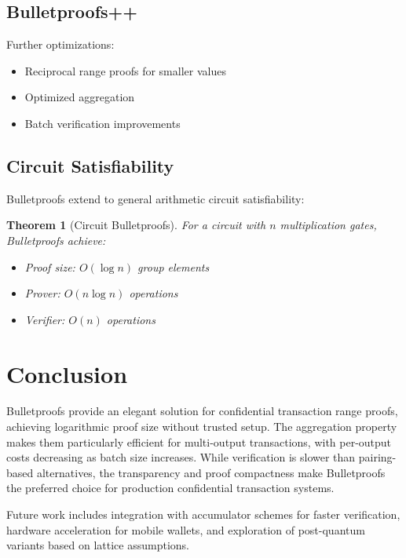 \documentclass[11pt,a4paper]{article}
\newtheorem{theorem}{Theorem}[section]
\begin{document}
\subsection{Bulletproofs++}

Further optimizations:
\begin{itemize}
    \item Reciprocal range proofs for smaller values
    \item Optimized aggregation
    \item Batch verification improvements
\end{itemize}

\subsection{Circuit Satisfiability}

Bulletproofs extend to general arithmetic circuit satisfiability:

\begin{theorem}[Circuit Bulletproofs]
For a circuit with $n$ multiplication gates, Bulletproofs achieve:
\begin{itemize}
    \item Proof size: $O(\log n)$ group elements
    \item Prover: $O(n \log n)$ operations
    \item Verifier: $O(n)$ operations
\end{itemize}
\end{theorem}

\section{Conclusion}

Bulletproofs provide an elegant solution for confidential transaction range proofs, achieving logarithmic proof size without trusted setup. The aggregation property makes them particularly efficient for multi-output transactions, with per-output costs decreasing as batch size increases. While verification is slower than pairing-based alternatives, the transparency and proof compactness make Bulletproofs the preferred choice for production confidential transaction systems.

Future work includes integration with accumulator schemes for faster verification, hardware acceleration for mobile wallets, and exploration of post-quantum variants based on lattice assumptions.
\end{document}
